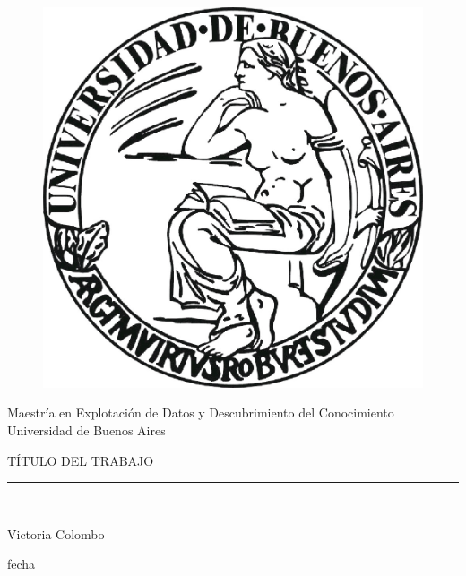 \documentclass[10 pt]{article}
\begin{document}
\begin{titlepage}

\begin{center}
\vspace*{-0.5in}
\begin{figure}[htb]
\begin{center}
\includegraphics[scale=.3]{imagenes/uba2.jpg}
\end{center}
\end{figure}

\begin{large}
Maestría en Explotación de Datos y Descubrimiento del Conocimiento\\
\vspace*{0.15in}
Universidad de Buenos Aires \\

\vspace*{0.6in}
\end{large}

\begin{large}
TÍTULO DEL TRABAJO\\


\end{large}
\vspace*{0.2in}
\vspace*{0.3in}


\vspace*{0.3in}
\rule{80mm}{0.1mm}\\
\vspace*{0.1in}
\begin{large}
Victoria Colombo

\vspace*{0.3in}

\vspace*{0.1in}fecha
\end{large}
\end{center}

\end{titlepage}
\end{document}
